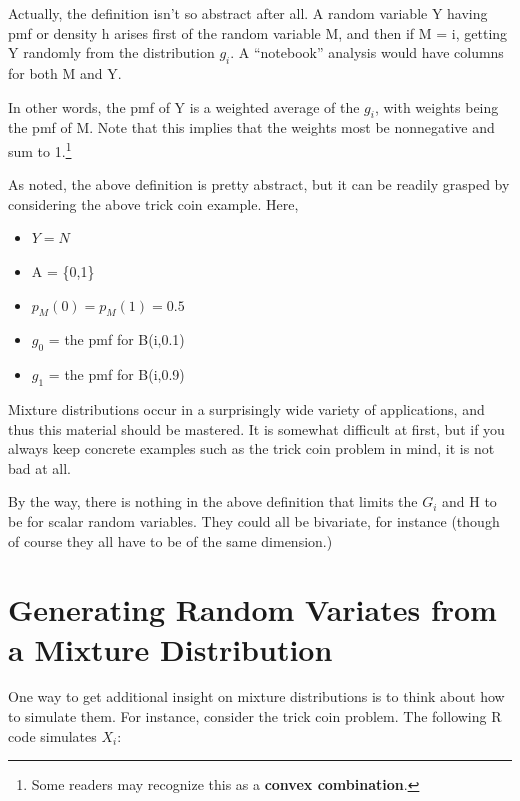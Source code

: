 \documentclass[11pt]{article}
\begin{document}
\vskip 0.5in

Actually, the definition isn't so abstract after all.  A random variable
Y having pmf or density h arises first of the random variable M, and then if M
= i, getting Y randomly from the distribution $g_i$.  A ``notebook''
analysis would have columns for both M and Y.

In other words, the pmf of Y is a weighted average of the $g_i$, with
weights being the pmf of M.  Note that this implies that the weights
most be nonnegative and sum to 1.\footnote{Some readers may recognize
this as a {\bf convex combination}.}

As noted, the above definition is pretty abstract, but it can be readily
grasped by considering the above trick coin example.  Here,

\begin{itemize}

\item $Y = N$

\item A = \{0,1\}

\item $p_M(0) = p_M(1) = 0.5$

\item $g_0$ = the pmf for B(i,0.1)

\item $g_1$ = the pmf for B(i,0.9)

\end{itemize}

Mixture distributions occur in a surprisingly wide variety of
applications, and thus this material should be mastered.  It is somewhat
difficult at first, but if you always keep concrete examples such as the
trick coin problem in mind, it is not bad at all.

By the way, there is nothing in the above definition that limits the
$G_i$ and H to be for scalar random variables.  They could all be
bivariate, for instance (though of course they all have to be of the
same dimension.)

\section{Generating Random Variates from a Mixture Distribution}

One way to get additional insight on mixture distributions is to think
about how to simulate them.  For instance, consider the trick coin problem.
The following R code simulates $X_i$:
\end{document}
